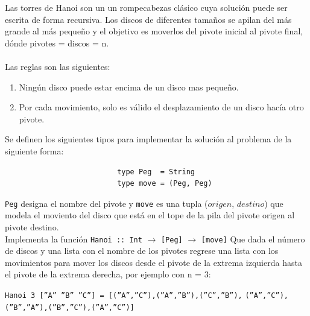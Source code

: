     \begin{exercise}
        Las torres de Hanoi son un un rompecabezas clásico cuya solución puede ser escrita de forma recursiva. Los discos de diferentes tamaños se apilan del más grande al más pequeño y el objetivo es moverlos del pivote inicial al pivote final, dónde pivotes = discos = n.\\\\
 Las reglas son  las siguientes: 
        \begin{enumerate}
            \item Ningún disco puede estar encima de un disco mas pequeño. 
            \item Por cada movimiento, solo es válido el desplazamiento de un disco hacía otro pivote.\\
        \end{enumerate}

        Se definen los siguientes tipos para implementar la solución al problema de la siguiente forma: 
        \begin{center}
            \begin{verbatim}
                          type Peg  = String
                          type move = (Peg, Peg)
            \end{verbatim}
        \end{center}
	\texttt{Peg} designa el nombre del pivote y \texttt{move} es una tupla ($origen$, $destino$) que modela el moviento del disco que está en el tope de la pila del pivote origen al pivote destino. \\

        Implementa la función \texttt{Hanoi :: Int} $\rightarrow$ \texttt{[Peg]} $\rightarrow$ \texttt{[move]}
        Que dada el número de discos y una lista con el nombre de los pivotes regrese una lista con los movimientos para mover los discos desde el pivote de la extrema izquierda hasta el pivote de la extrema derecha, por ejemplo con n = 3: 
        \begin{center}
            \texttt{Hanoi 3  [''A'' ''B'' ''C''] =  [(''A'',''C''),(''A'',''B''),(''C'',''B''),}
	 \texttt{(''A'',''C''),(''B'',''A''),(''B'',''C''),(''A'',''C'')]}
        \end{center}
		

    \end{exercise}  
